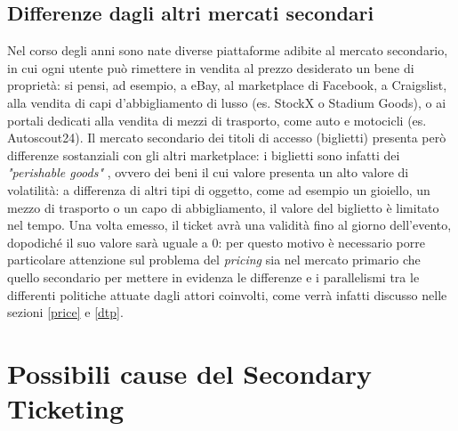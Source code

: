 \subsection{Differenze dagli altri mercati secondari}
Nel corso degli anni sono nate diverse piattaforme adibite al mercato secondario, in cui ogni utente può rimettere in vendita al prezzo desiderato un bene di proprietà: si pensi, ad esempio, a eBay, al marketplace di Facebook, a Craigslist, alla vendita di capi d'abbigliamento di lusso (es. StockX o Stadium Goods), o ai portali dedicati alla vendita di mezzi di trasporto, come auto e motocicli (es. Autoscout24).
Il mercato secondario dei titoli di accesso (biglietti) presenta però differenze sostanziali con gli altri marketplace: i biglietti sono infatti dei \textit{"perishable goods"} \cite{}, ovvero dei beni il cui valore presenta un alto valore di volatilità: a differenza di altri tipi di oggetto, come ad esempio un gioiello, un mezzo di trasporto o un capo di abbigliamento, il valore del biglietto è limitato nel tempo. Una volta emesso, il ticket avrà una validità fino al giorno dell'evento, dopodiché il suo valore sarà uguale a 0: per questo motivo è necessario porre particolare attenzione sul problema del \textit{pricing} sia nel mercato primario che quello secondario per mettere in evidenza le differenze e i parallelismi tra le differenti politiche attuate dagli attori coinvolti, come verrà infatti discusso nelle sezioni \ref{price} e \ref{dtp}. 

\section{Possibili cause del Secondary Ticketing}

